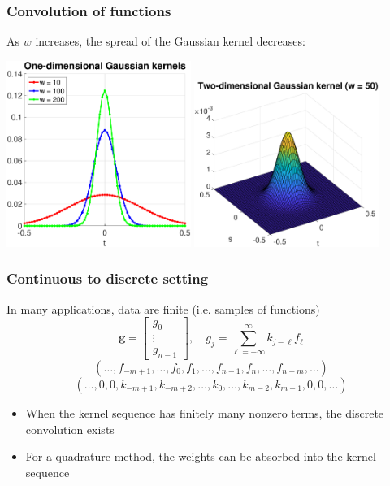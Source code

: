 \documentclass[t]{beamer}
\newcommand{\gVec}{\mathbf{g}}	%
\begin{document}
\begin{frame}
\frametitle{Convolution of functions}
As $w$ increases, the spread of the Gaussian kernel decreases: \vspace*{0.25 in}
\begin{center}
\includegraphics[width=0.45\textwidth]{Figures/GaussianKernels1D.eps}
\includegraphics[width=0.45\textwidth]{Figures/GaussianKernel2D.eps}
\end{center}
\end{frame}

\begin{frame}
\frametitle{Continuous to discrete setting}
In many applications, data are finite (i.e. samples of functions)
\[\gVec = \begin{bmatrix}
g_0 \\
\vdots \\
g_{n-1}
\end{bmatrix}, \quad g_j = \sum_{\ell=-\infty}^{\infty} k_{j-\ell}f_{\ell}\]
\[(\ldots,f_{-m+1},\ldots,f_0,f_1,\ldots,f_{n-1},f_n,\ldots,f_{n+m},\ldots)\]
\[(\ldots,0,0,k_{-m+1},k_{-m+2},\ldots,k_0,\ldots,k_{m-2},k_{m-1},0,0,\ldots)\]
\begin{itemize}
\item When the kernel sequence has finitely many nonzero terms, the discrete convolution exists
\item For a quadrature method, the weights can be absorbed into the kernel sequence
\end{itemize}
\end{frame}
\end{document}
